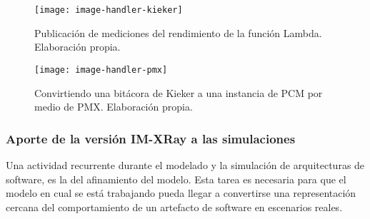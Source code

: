


\begin{figure}[h]
  \centering
  \texttt{[image: image-handler-kieker]}
  \caption[Publicación de mediciones del rendimiento de la función Lambda.]{Publicación de mediciones del rendimiento de la función Lambda. Elaboración propia.}
  \label{fig:image-handler-kieker}
\end{figure}

\begin{figure}[h]
  \centering
  \texttt{[image: image-handler-pmx]}
  \caption[Convirtiendo una bitácora de Kieker a una instancia de PCM por medio de PMX.]{Convirtiendo una bitácora de Kieker a una instancia de PCM por medio de PMX. Elaboración propia.}
  \label{fig:image-handler-pmx}
\end{figure}

\subsubsection{Aporte de la versión IM-XRay a las simulaciones}\label{sec:image-handler-xray}
Una actividad recurrente durante el modelado y la simulación de arquitecturas de software, es la del afinamiento del modelo. Esta tarea es necesaria para que el modelo en cual se está trabajando pueda llegar a convertirse una representación cercana del comportamiento de un artefacto de software en escenarios reales. 

